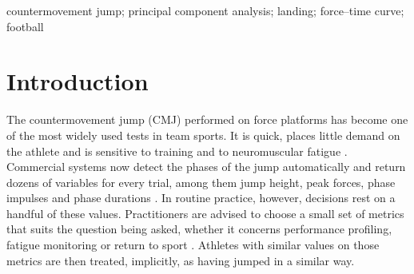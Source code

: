 \begin{abstract}
Force-plate software reduces each countermovement jump (CMJ) to a few discrete metrics, and athletes with similar values are treated as equivalent. This study examined whether jumps with similar conventional metrics share the same force--time curve, and how much curve-shape variation those metrics capture. In total, \nTrials{} CMJ trials from \nAth{} male footballers (median age \ageMedian{} years), recorded on force plates, were normalised to body weight; the take-off phase and the landing phase, which ended at the lowest point of the centre of mass, were each time-normalised and concatenated. Principal component analysis retained four components that explained \cumFour\% of curve variance, each located almost entirely in the landing phase. Among trials matched on jump height, component-score dispersion was similar to that of the full sample (standard-deviation ratios \jhRatioRange; whole curve \wholeJh), and matching on relative peak force had no effect. Four vendor metrics, age and body mass explained \rtwoRange\% of each component (\cvRange\% under athlete-grouped cross-validation). The first component was most closely related to landing duration ($r$~=~\rLdPCA). Between-athlete differences accounted for \betweenRange\% of component variance. With a fixed 1-s landing window, a take-off component emerged that the metrics largely explained. Equal jump heights conceal different, largely trial-specific landing strategies.
\end{abstract}

\begin{keywords}
countermovement jump; principal component analysis; landing; force--time curve; football
\end{keywords}

\section{Introduction}

The countermovement jump (CMJ) performed on force platforms has become one of the most widely used tests in team sports. It is quick, places little demand on the athlete and is sensitive to training and to neuromuscular fatigue \citep{claudino2017,gathercole2015}. Commercial systems now detect the phases of the jump automatically and return dozens of variables for every trial, among them jump height, peak forces, phase impulses and phase durations \citep{mcmahon2018}. In routine practice, however, decisions rest on a handful of these values. Practitioners are advised to choose a small set of metrics that suits the question being asked, whether it concerns performance profiling, fatigue monitoring or return to sport \citep{bishop2023}. Athletes with similar values on those metrics are then treated, implicitly, as having jumped in a similar way.

